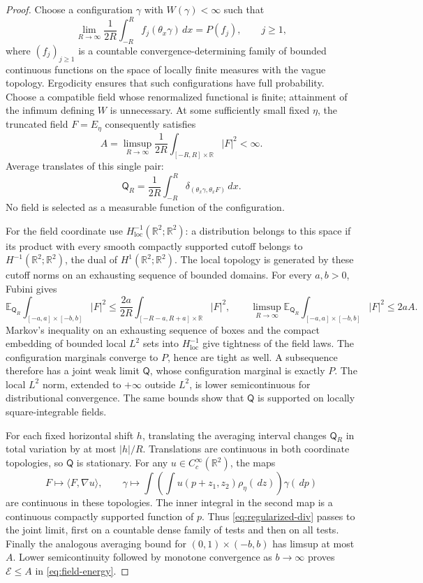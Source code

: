 \documentclass[11pt,reqno]{amsart}
\numberwithin{equation}{section}
\theoremstyle{definition}
\theoremstyle{remark}
\newcommand{\R}{\mathbb R}
\newcommand{\E}{\mathbb E}
\newcommand{\1}{\mathbf 1}
\newcommand{\dd}{\,d}
\newcommand{\calE}{\mathcal E}
\begin{document}
\begin{proof}
Choose a configuration $\gamma$ with $W(\gamma)<\infty$ such that
\begin{equation}\label{eq:generic-configuration}
\lim_{R\to\infty}\frac1{2R}\int_{-R}^R
 f_j(\theta_x\gamma)\dd x=P(f_j),\qquad j\ge1,
\end{equation}
where $(f_j)_{j\ge1}$ is a countable convergence-determining family of
bounded continuous functions on the space of locally finite measures
with the vague topology. Ergodicity ensures that
such configurations have full probability. Choose a compatible field
whose renormalized functional is finite; attainment of the infimum
defining $W$ is unnecessary. At some sufficiently small fixed $\eta$,
the truncated field $F=E_\eta$ consequently satisfies
\[
A=\limsup_{R\to\infty}\frac1{2R}
\int_{[-R,R]\times\R}|F|^2<\infty.
\]
Average translates of this single pair:
\[
\mathsf Q_R=\frac1{2R}\int_{-R}^R
\delta_{(\theta_x\gamma,\theta_xF)}\dd x.
\]
No field is selected as a measurable function of the configuration.

For the field coordinate use $H^{-1}_{\mathrm{loc}}(\R^2;\R^2)$:
a distribution belongs to this space if its product with every smooth
compactly supported cutoff belongs to $H^{-1}(\R^2;\R^2)$, the dual
of $H^1(\R^2;\R^2)$. The local topology is generated by these cutoff
norms on an exhausting sequence of bounded domains. For every $a,b>0$, Fubini gives
\[
\E_{\mathsf Q_R}
\int_{[-a,a]\times[-b,b]}|F|^2
\le \frac{2a}{2R}
\int_{[-R-a,R+a]\times\R}|F|^2,
\qquad
\limsup_{R\to\infty}\E_{\mathsf Q_R}
\int_{[-a,a]\times[-b,b]}|F|^2\le 2aA.
\]
Markov's inequality on an exhausting sequence of boxes and the compact
embedding of bounded local $L^2$ sets into $H^{-1}_{\mathrm{loc}}$
give tightness of the field laws. The configuration marginals converge
to $P$, hence are tight as well. A subsequence therefore has a joint
weak limit $\mathsf Q$, whose configuration marginal is exactly $P$.
The local $L^2$ norm, extended to $+\infty$ outside $L^2$, is lower
semicontinuous for distributional convergence. The same bounds show
that $\mathsf Q$ is supported on locally square-integrable fields.

For each fixed horizontal shift $h$, translating the averaging interval
changes $\mathsf Q_R$ in total variation by at most $|h|/R$.
Translations are continuous in both coordinate topologies, so
$\mathsf Q$ is stationary. For any $u\in C_c^\infty(\R^2)$, the maps
\[
F\longmapsto\langle F,\nabla u\rangle,
\qquad
\gamma\longmapsto
\int\!\left(\int u(p+z_1,z_2)\rho_\eta(\dd z)\right)\gamma(\dd p)
\]
are continuous in these topologies. The inner integral in the second
map is a continuous compactly supported function of $p$. Thus
\eqref{eq:regularized-div} passes to the joint limit, first on a
countable dense family of tests and then on all tests.
Finally the analogous averaging bound for $(0,1)\times(-b,b)$ has
limsup at most $A$. Lower semicontinuity followed by monotone
convergence as $b\to\infty$ proves $\calE\le A$ in
\eqref{eq:field-energy}.
\end{proof}
\end{document}
